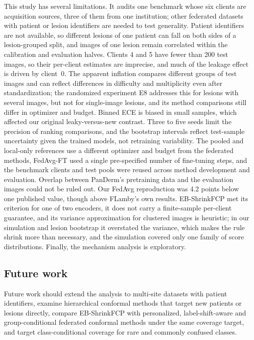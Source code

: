 \documentclass[VANCOUVER,Times1COL]{WileyNJDv5}
\begin{document}
This study has several limitations. It audits one benchmark whose six clients are acquisition sources,
three of them from one institution; other federated datasets with patient or lesion identifiers are needed
to test generality. Patient identifiers are not available, so different lesions of one patient can fall on
both sides of a lesion-grouped split, and images of one lesion remain correlated within the calibration and
evaluation halves. Clients 4 and 5 have fewer than 200 test images, so their per-client estimates are
imprecise, and much of the leakage effect is driven by client~0. The apparent inflation compares different
groups of test images and can reflect differences in difficulty and multiplicity even after
standardization; the randomized experiment E8 addresses this for lesions with several images, but not for single-image lesions, and its method comparisons still differ in optimizer and budget. Binned ECE is biased in small samples, which affected our original leaky-versus-new
contrast. Three to five seeds limit the precision of ranking comparisons, and the bootstrap intervals
reflect test-sample uncertainty given the trained models, not retraining variability. The pooled and
local-only references use a different optimizer and budget from the federated methods, FedAvg-FT used a
single pre-specified number of fine-tuning steps, and the benchmark clients and test pools were reused
across method development and evaluation. Overlap between PanDerm's pretraining data and the evaluation
images could not be ruled out. Our FedAvg reproduction was 4.2 points below one published value, though
above FLamby's own results. EB-ShrinkFCP met its criterion for one of two encoders, it does not carry a
finite-sample per-client guarantee, and its variance approximation for clustered images is heuristic; in
our simulation and lesion bootstrap it overstated the variance, which makes the rule shrink more than
necessary, and the simulation covered only one family of score distributions.
Finally, the mechanism analysis is exploratory.

\subsection{Future work}

Future work should extend the analysis to multi-site datasets with patient identifiers, examine
hierarchical conformal methods that target new patients or lesions directly, compare EB-ShrinkFCP with
personalized, label-shift-aware and group-conditional federated conformal methods
\cite{min2025pfcp,plassier2023labelshift,wen2026gcfcp} under the same coverage target, and target
class-conditional coverage for rare and commonly confused classes.
\end{document}
